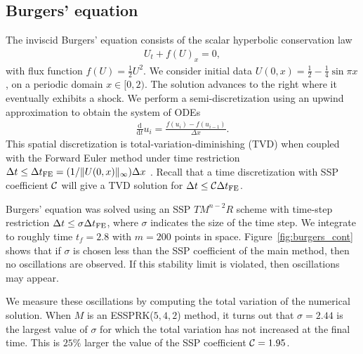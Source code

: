 \subsection{Burgers' equation}\label{subsubsec:burgers}
The inviscid Burgers' equation consists of the scalar hyperbolic conservation law
\begin{align}\label{eq:HCL}
    U_{t} + f(U)_{x} = 0,
\end{align}
with flux function $f(U) = \frac{1}{2}U^{2}$. 
We consider initial data
$U(0,x)  = \frac{1}{2} - \frac{1}{4}\sin{\pi x}$,
on a periodic domain $x \in [0,2)$.
The solution advances to the right where it eventually exhibits a shock. 
We perform a semi-discretization
using an upwind approximation to obtain the system of ODEs
\begin{align*}\label{eq:burgers_flux}
	\frac{\textrm{d}}{\textrm{d} t} u_i = \frac{f(u_{i}) - f(u_{i-1})}{\Delta x}.
\end{align*}
This spatial discretization is total-variation-diminishing (TVD) when
coupled with the Forward Euler method under time restriction
$\Delta t \leq {\Delta t}_{\text{FE}} = (1 / \|U(0,x)\|_{\infty}) \Delta x$
\cite{Laney:1998}.  %
Recall that a time discretization with SSP
coefficient $\mathcal{C}$ will give a TVD solution for $\Delta t \leq
\mathcal{C} {\Delta t}_{\text{FE}}$.

Burgers' equation was solved using an SSP $TM^{n-2}R$ scheme with time-step
restriction $\Delta t \leq \sigma{\Delta t}_{\text{FE}}$, where $\sigma$ indicates the size 
of the time step. 
We integrate to roughly time $t_{f} = 2.8$ with $m = 200$ points in space.
Figure~\ref{fig:burgers_cont} shows that if $\sigma$ is chosen less than the SSP
coefficient of the main method, then no oscillations are observed. 
If this stability limit is violated, then oscillations may appear.

We measure these oscillations by computing the total variation of the 
numerical solution.
When $M$ is an ESSPRK($5,4,2$) method,
it turns out that $\sigma = 2.44$ is the largest value of $\sigma$
for which the total variation has not increased at the final time.
This is $25\%$ larger the value of the SSP coefficient $\mathcal{C} = 1.95$.

